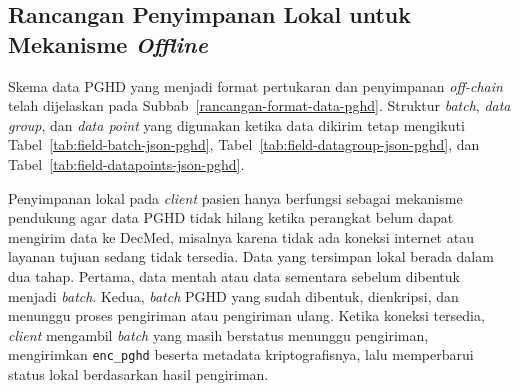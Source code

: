 \subsection{Rancangan Penyimpanan Lokal untuk Mekanisme \textit{Offline}}\label{rancangan-solusi-format-data-lokal}

Skema data PGHD yang menjadi format pertukaran dan penyimpanan \textit{off-chain} telah dijelaskan pada Subbab~\ref{rancangan-format-data-pghd}. 
Struktur \textit{batch}, \textit{data group}, dan \textit{data point} yang digunakan ketika data dikirim tetap mengikuti Tabel~\ref{tab:field-batch-json-pghd}, Tabel~\ref{tab:field-datagroup-json-pghd}, dan Tabel~\ref{tab:field-datapoints-json-pghd}.

Penyimpanan lokal pada \textit{client} pasien hanya berfungsi sebagai mekanisme pendukung agar data PGHD tidak hilang ketika perangkat belum dapat mengirim data ke DecMed, misalnya karena tidak ada koneksi internet atau layanan tujuan sedang tidak tersedia.
Data yang tersimpan lokal berada dalam dua tahap.
Pertama, data mentah atau data sementara sebelum dibentuk menjadi \textit{batch}.
Kedua, \textit{batch} PGHD yang sudah dibentuk, dienkripsi, dan menunggu proses pengiriman atau pengiriman ulang.
Ketika koneksi tersedia, \textit{client} mengambil \textit{batch} yang masih berstatus menunggu pengiriman, mengirimkan \texttt{enc\_pghd} beserta metadata kriptografisnya, lalu memperbarui status lokal berdasarkan hasil pengiriman.
